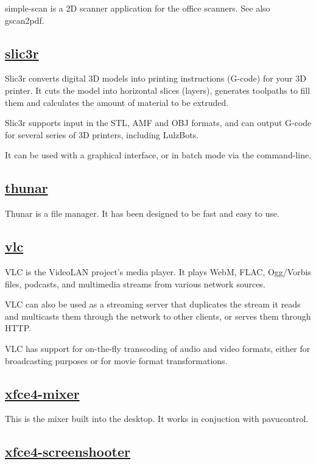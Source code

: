 simple-scan is a 2D scanner application for the office scanners. See also
gscan2pdf.

\subsection{\href{http://slic3r.org/}{slic3r}}

 Slic3r converts digital 3D models into printing instructions (G-code)
 for your 3D printer. It cuts the model into horizontal slices (layers),
 generates toolpaths to fill them and calculates the amount of material
 to be extruded.
 
 Slic3r supports input in the STL, AMF and OBJ formats, and can output
 G-code for several series of 3D printers, including LulzBots.
 
 It can be used with a graphical interface, or in batch mode via the
 command-line.

\subsection{\href{http://thunar.xfce.org}{thunar}}

 Thunar is a file manager.
 It has been designed to be fast and easy to use.
 
\subsection{\href{http://www.videolan.org/vlc/}{vlc}}

 VLC is the VideoLAN project's media player. It plays
 WebM, FLAC, Ogg/Vorbis files,
 podcasts, and multimedia streams from various network sources.
 
 VLC can also be used as a streaming server that duplicates the stream it
 reads and multicasts them through the network to other clients, or serves
 them through HTTP.
 
 VLC has support for on-the-fly transcoding of audio and video formats,
 either for broadcasting purposes or for movie format transformations.

\subsection{\href{http://www.xfce.org/}{xfce4-mixer}}

This is the mixer built into the desktop. It works in conjuction with
pavucontrol.

\subsection{\href{http://goodies.xfce.org/projects/applications/xfce4-screenshooter}{xfce4-screenshooter}}

